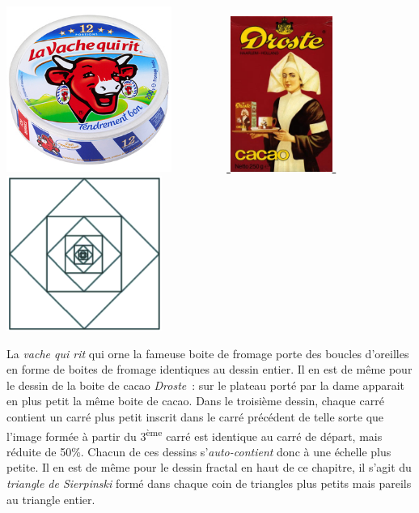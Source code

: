 	{
	 \includegraphics[width=5.41cm,height=5.41cm]{image/a2012Logique2eme-img016.jpg} 
	\ \ \ \ \ \ \ \ \ 
	\href{http://upload.wikimedia.org/wikipedia/commons/6/62/Droste.jpg}{
	\includegraphics[width=3.328cm,height=5.098cm]{image/a2012Logique2eme-img017.jpg} } 
	\ \ \ \ \ \ \ \ \ 
	\includegraphics[width=5.089cm,height=5.052cm]{image/a2012Logique2eme-img018.png} }


	La \textit{vache qui rit} qui orne la fameuse boite 
	de fromage porte des boucles d'oreilles en forme de boites de
	fromage identiques au dessin entier. Il en est de même pour 
	le dessin de la boite de cacao \textit{Droste}~: sur le
	plateau porté par la dame apparait en plus petit la même 
	boite de cacao. Dans le troisième dessin, chaque carré
	contient un carré plus petit inscrit dans le carré précédent 
	de telle sorte que l'image formée à partir du 3\textsuperscript{ème} 
	carré est identique au carré de départ, mais réduite de 50\%. 
	Chacun de ces dessins s'\textit{auto-contient} donc à une échelle 
	plus petite. Il en est de même pour le dessin fractal en haut de
	ce chapitre, il s'agit du \textit{triangle de Sierpinski} 
	formé dans chaque coin de triangles plus petits mais pareils
	au triangle entier.


